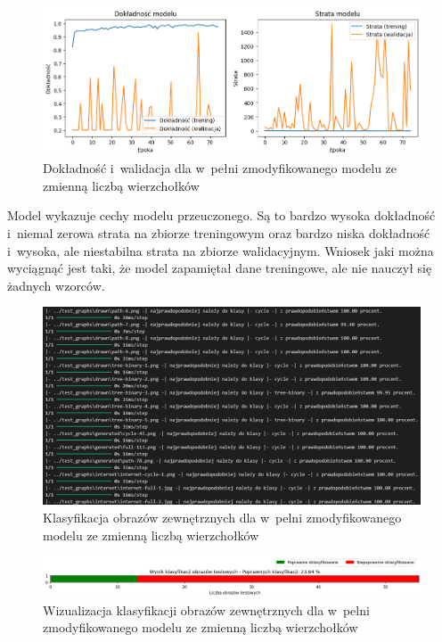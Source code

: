 \begin{figure}[ht]
	\centering
	\includegraphics[width=14cm]{resources/tests/images/v4/multiple_edges_img.png}
	\caption{Dokładność i~walidacja dla w~pełni zmodyfikowanego modelu ze zmienną liczbą wierzchołków}
	\label{Fig:tests-var-2a}
\end{figure}
\FloatBarrier

Model wykazuje cechy modelu przeuczonego.
Są to bardzo wysoka dokładność i~niemal zerowa strata na zbiorze treningowym
oraz bardzo niska dokładność i~wysoka, ale niestabilna strata na zbiorze walidacyjnym.
Wniosek jaki można wyciągnąć jest taki, że model zapamiętał dane treningowe, ale nie nauczył się żadnych wzorców.

\begin{figure}[ht]
	\centering
	\includegraphics[width=14cm]{resources/tests/images/v4/multiple_edges_txt.png}
	\caption{Klasyfikacja obrazów zewnętrznych dla w~pelni zmodyfikowanego modelu ze zmienną liczbą wierzchołków}
	\label{Fig:tests-var-2b}
\end{figure}
\FloatBarrier

\begin{figure}[ht]
	\centering
	\includegraphics[width=14cm]{resources/tests/images/v4/multiple_edges_bar.png}
	\caption{Wizualizacja klasyfikacji obrazów zewnętrznych dla w~pelni zmodyfikowanego modelu ze zmienną liczbą wierzchołków}
	\label{Fig:tests-var-2c}
\end{figure}
\FloatBarrier

